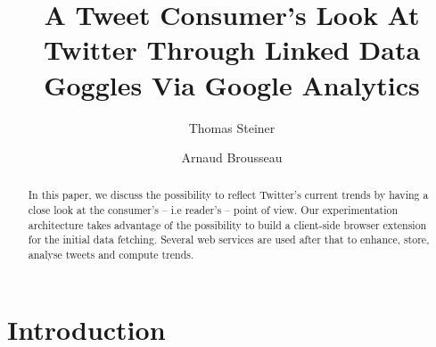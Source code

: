 \documentclass[runningheads,a4paper]{llncs}
\begin{document}
\mainmatter  %

\title{A Tweet Consumer's Look At Twitter Through Linked Data Goggles Via Google Analytics}


%
%
\author{Thomas Steiner \and Arnaud Brousseau}

%
%


\maketitle

\begin{abstract}
In this paper, we discuss the possibility to reflect Twitter's current trends by having a close look at the consumer's -- i.e reader's -- point of view. Our experimentation architecture takes advantage of the possibility to build a client-side browser extension for the initial data fetching. Several web services are used after that to enhance, store, analyse tweets and compute trends.
\end{abstract}

\section{Introduction}
\end{document}
